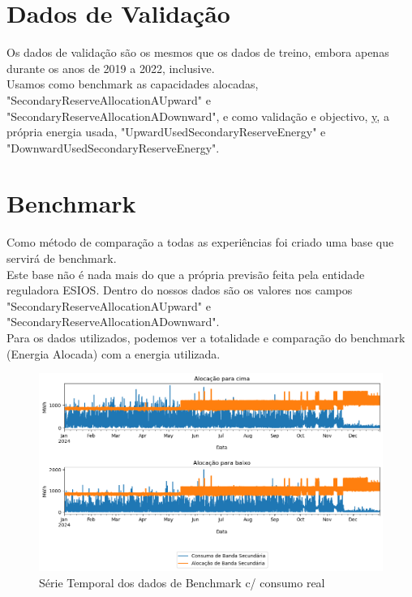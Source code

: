 \section{Dados de Validação}
Os dados de validação são os mesmos que os dados de treino, embora apenas durante os anos de 2019 a 2022, inclusive.\\
Usamos como benchmark as capacidades alocadas, "SecondaryReserveAllocationAUpward" e "SecondaryReserveAllocationADownward", e como validação e objectivo, \hyperref[se:metneuralnet]{y}, a própria energia usada, "UpwardUsedSecondaryReserveEnergy" e "DownwardUsedSecondaryReserveEnergy".

\section{Benchmark}

Como método de comparação a todas as experiências foi criado uma base que servirá de benchmark.\\
Este base não é nada mais do que a própria previsão feita pela entidade reguladora \gls{ESIOS}. Dentro do nossos dados são os valores nos campos "SecondaryReserveAllocationAUpward" e "SecondaryReserveAllocationADownward".\\
Para os dados utilizados, podemos ver a totalidade e comparação do benchmark (Energia Alocada) com a energia utilizada.\\

\begin{figure}[H]
    \centering
    \includegraphics[width=\textwidth]{plots/benchmark_alocacoes_validacao.png}
    \caption{Série Temporal dos dados de Benchmark c/ consumo real}
    \label{fig:benchmarktimeseries}
\end{figure}

